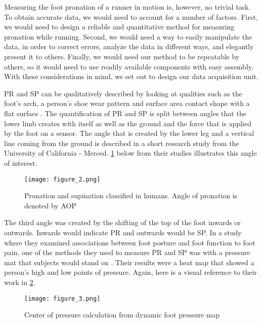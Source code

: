 Measuring the foot pronation of a runner in motion is, however, no trivial task.
To obtain accurate data, we would need to account for a number of factors.
First, we would need to design a reliable and quantitative method for measuring pronation while running.
Second, we would need a way to easily manipulate the data, in order to correct errors, analyze the data in different ways, and elegantly present it to others.
Finally, we would need our method to be repeatable by others, so it would need to use readily available components with easy assembly.
With these considerations in mind, we set out to design our data acquisition unit.\par

PR and SP can be qualitatively described by looking at qualities such as the foot’s arch, a person's shoe wear pattern and surface area contact shape with a flat surface \parencite{erickson}.
The quantification of PR and SP is split between angles that the lower limb creates with itself as well as the ground and the force that is applied by the foot on a sensor.
The angle that is created by the lower leg and a vertical line coming from the ground is described in a short research study from the University of California - Merced.
\ref{fig:x AOP} below from their studies illustrates this angle of interest.\par

\begin{figure}[h]
  \centering
  \texttt{[image: figure\_2.png]}
  \caption[Pronation angle]{Pronation and supination classified in humans. Angle of pronation is denoted by AOP \parencite{erickson}}
  \label{fig:x AOP}
\end{figure}
The third angle was created by the shifting of the top of the foot inwards or outwards.
Inwards would indicate PR and outwards would be SP. In a study where they examined associations between foot posture and foot function to foot pain, one of the methods they used to measure PR and SP was with a pressure mat that subjects would stand on \parencite{menz}.
Their results were a heat map that showed a person's high and low points of pressure. Again, here is a visual reference to their work in \ref{fig:x press. map}.\par

\begin{figure}[h]
  \centering
  \texttt{[image: figure\_3.png]}
  \caption[Foot pressure map]{Center of pressure calculation from dynamic foot pressure map \parencite{menz}}
  \label{fig:x press. map}
\end{figure}

